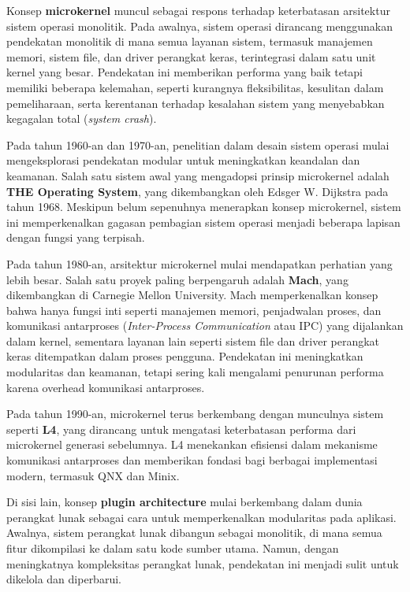 Konsep \textbf{microkernel} muncul sebagai respons terhadap keterbatasan arsitektur sistem operasi monolitik. Pada awalnya, sistem operasi dirancang menggunakan pendekatan monolitik di mana semua layanan sistem, termasuk manajemen memori, sistem file, dan driver perangkat keras, terintegrasi dalam satu unit kernel yang besar. Pendekatan ini memberikan performa yang baik tetapi memiliki beberapa kelemahan, seperti kurangnya fleksibilitas, kesulitan dalam pemeliharaan, serta kerentanan terhadap kesalahan sistem yang menyebabkan kegagalan total (\textit{system crash}).

Pada tahun 1960-an dan 1970-an, penelitian dalam desain sistem operasi mulai mengeksplorasi pendekatan modular untuk meningkatkan keandalan dan keamanan. Salah satu sistem awal yang mengadopsi prinsip microkernel adalah \textbf{THE Operating System}, yang dikembangkan oleh Edsger W. Dijkstra pada tahun 1968. Meskipun belum sepenuhnya menerapkan konsep microkernel, sistem ini memperkenalkan gagasan pembagian sistem operasi menjadi beberapa lapisan dengan fungsi yang terpisah.

Pada tahun 1980-an, arsitektur microkernel mulai mendapatkan perhatian yang lebih besar. Salah satu proyek paling berpengaruh adalah \textbf{Mach}, yang dikembangkan di Carnegie Mellon University. Mach memperkenalkan konsep bahwa hanya fungsi inti seperti manajemen memori, penjadwalan proses, dan komunikasi antarproses (\textit{Inter-Process Communication} atau IPC) yang dijalankan dalam kernel, sementara layanan lain seperti sistem file dan driver perangkat keras ditempatkan dalam proses pengguna. Pendekatan ini meningkatkan modularitas dan keamanan, tetapi sering kali mengalami penurunan performa karena overhead komunikasi antarproses.

Pada tahun 1990-an, microkernel terus berkembang dengan munculnya sistem seperti \textbf{L4}, yang dirancang untuk mengatasi keterbatasan performa dari microkernel generasi sebelumnya. L4 menekankan efisiensi dalam mekanisme komunikasi antarproses dan memberikan fondasi bagi berbagai implementasi modern, termasuk QNX dan Minix.

Di sisi lain, konsep \textbf{plugin architecture} mulai berkembang dalam dunia perangkat lunak sebagai cara untuk memperkenalkan modularitas pada aplikasi. Awalnya, sistem perangkat lunak dibangun sebagai monolitik, di mana semua fitur dikompilasi ke dalam satu kode sumber utama. Namun, dengan meningkatnya kompleksitas perangkat lunak, pendekatan ini menjadi sulit untuk dikelola dan diperbarui.

